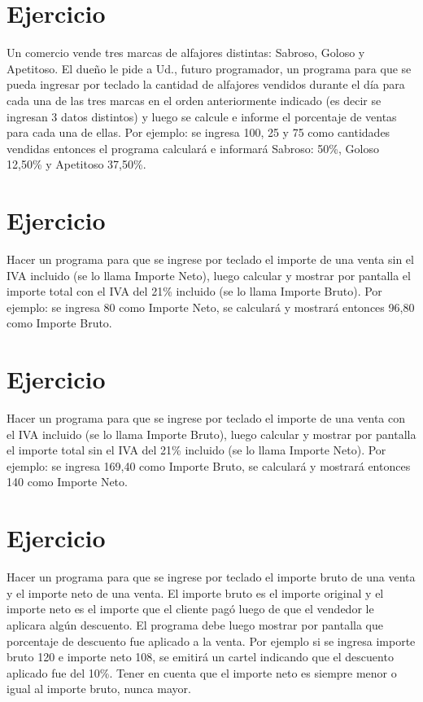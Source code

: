 \documentclass[12pt,a4paper,twoside]{article}
\begin{document}
\newpage
\section{Ejercicio }

\hspace*{1cm}Un comercio vende tres marcas de alfajores distintas: Sabroso, Goloso y Apetitoso. El dueño le pide a Ud., futuro programador, un programa para que se pueda ingresar por teclado la cantidad de alfajores vendidos durante el día para cada una de las tres marcas en el orden anteriormente indicado (es decir se ingresan 3 datos distintos) y luego se calcule e informe el porcentaje de ventas para cada una de ellas.
Por ejemplo: se ingresa 100, 25 y 75 como cantidades vendidas entonces el programa
calculará e informará Sabroso: 50\%, Goloso 12,50\% y Apetitoso 37,50\%.

\newpage
\section{Ejercicio }

\hspace*{1cm}Hacer un programa para que se ingrese por teclado el importe de una venta sin el IVA incluido (se lo llama Importe Neto), luego calcular y mostrar por pantalla el importe total con el IVA del 21\% incluido (se lo llama Importe Bruto). Por ejemplo: se ingresa 80 como Importe Neto, se calculará y mostrará entonces 96,80 como Importe Bruto.

\newpage
\section{Ejercicio }

\hspace*{1cm}Hacer un programa para que se ingrese por teclado el importe de una venta con el IVA incluido (se lo llama Importe Bruto), luego calcular y mostrar por pantalla el importe total sin el IVA del 21\% incluido (se lo llama Importe Neto).
Por ejemplo: se ingresa 169,40 como Importe Bruto, se calculará y mostrará entonces 140
como Importe Neto.

\newpage
\section{Ejercicio }

\hspace*{1cm}Hacer un programa para que se ingrese por teclado el importe bruto de una venta y el importe neto de una venta. El importe bruto es el importe original y el importe neto es el importe que el cliente pagó luego de que el vendedor le aplicara algún descuento. El programa debe luego mostrar por pantalla que porcentaje de descuento fue aplicado a la venta. Por ejemplo si se ingresa importe bruto 120 e importe neto 108, se emitirá un cartel indicando que el descuento aplicado fue del 10\%. Tener en cuenta que el importe neto es siempre menor o igual al importe bruto, nunca mayor.
\end{document}
